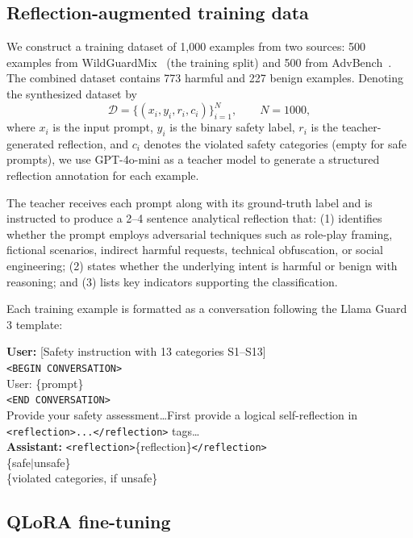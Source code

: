 \documentclass[11pt]{article}
\begin{document}
\subsection{Reflection-augmented training data}
\label{sec:synthesis}

We construct a training dataset of 1{,}000 examples from two sources: 500 examples from WildGuardMix~\citep{han2024wildguard} (the training split) and 500 from AdvBench~\citep{zou2023universal}. The combined dataset contains 773 harmful and 227 benign examples. Denoting the synthesized dataset by
\begin{equation}
  \mathcal{D} = \{(x_i, y_i, r_i, c_i)\}_{i=1}^{N}, \qquad N=1000,
\end{equation}
where $x_i$ is the input prompt, $y_i$ is the binary safety label, $r_i$ is the teacher-generated reflection, and $c_i$ denotes the violated safety categories (empty for safe prompts), we use GPT-4o-mini as a teacher model to generate a structured reflection annotation for each example.

The teacher receives each prompt along with its ground-truth label and is instructed to produce a 2--4 sentence analytical reflection that: (1) identifies whether the prompt employs adversarial techniques such as role-play framing, fictional scenarios, indirect harmful requests, technical obfuscation, or social engineering; (2) states whether the underlying intent is harmful or benign with reasoning; and (3) lists key indicators supporting the classification.

Each training example is formatted as a conversation following the Llama Guard 3 template:
\begin{tcolorbox}[graybox]
\textbf{User:} [Safety instruction with 13 categories S1--S13] \\
\texttt{<BEGIN CONVERSATION>} \\
User: \{prompt\} \\
\texttt{<END CONVERSATION>} \\
Provide your safety assessment\ldots First provide a logical self-reflection in \texttt{<reflection>...</reflection>} tags\ldots \\[4pt]
\textbf{Assistant:} \texttt{<reflection>}\{reflection\}\texttt{</reflection>} \\
\{safe$|$unsafe\} \\
\{violated categories, if unsafe\}
\end{tcolorbox}

\subsection{QLoRA fine-tuning}
\end{document}
